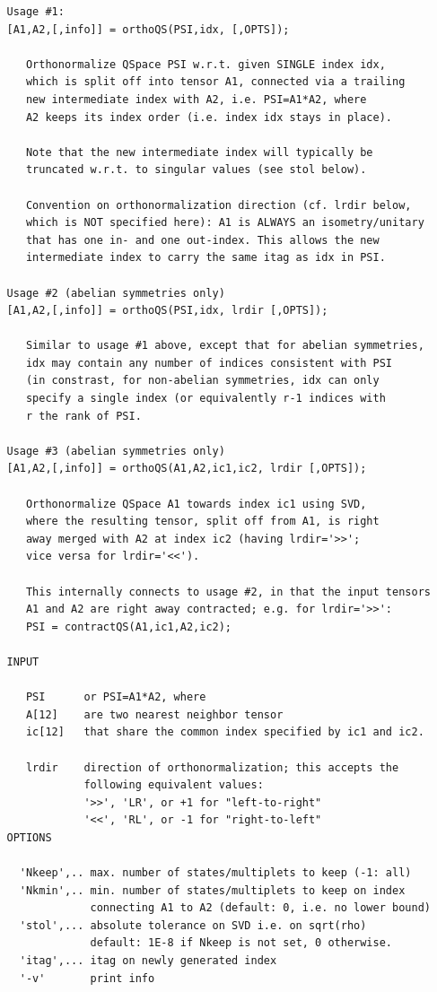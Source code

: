 \documentclass[twoside,12pt]{article}
\begin{document}
\begin{verbatim}
   Usage #1:
   [A1,A2,[,info]] = orthoQS(PSI,idx, [,OPTS]);
 
      Orthonormalize QSpace PSI w.r.t. given SINGLE index idx,
      which is split off into tensor A1, connected via a trailing
      new intermediate index with A2, i.e. PSI=A1*A2, where
      A2 keeps its index order (i.e. index idx stays in place).
 
      Note that the new intermediate index will typically be
      truncated w.r.t. to singular values (see stol below).
 
      Convention on orthonormalization direction (cf. lrdir below,
      which is NOT specified here): A1 is ALWAYS an isometry/unitary
      that has one in- and one out-index. This allows the new
      intermediate index to carry the same itag as idx in PSI.
 
   Usage #2 (abelian symmetries only)
   [A1,A2,[,info]] = orthoQS(PSI,idx, lrdir [,OPTS]);
 
      Similar to usage #1 above, except that for abelian symmetries,
      idx may contain any number of indices consistent with PSI
      (in constrast, for non-abelian symmetries, idx can only
      specify a single index (or equivalently r-1 indices with
      r the rank of PSI.
 
   Usage #3 (abelian symmetries only)
   [A1,A2,[,info]] = orthoQS(A1,A2,ic1,ic2, lrdir [,OPTS]);
 
      Orthonormalize QSpace A1 towards index ic1 using SVD,
      where the resulting tensor, split off from A1, is right
      away merged with A2 at index ic2 (having lrdir='>>';
      vice versa for lrdir='<<').
 
      This internally connects to usage #2, in that the input tensors
      A1 and A2 are right away contracted; e.g. for lrdir='>>':
      PSI = contractQS(A1,ic1,A2,ic2);
 
   INPUT
 
      PSI      or PSI=A1*A2, where
      A[12]    are two nearest neighbor tensor
      ic[12]   that share the common index specified by ic1 and ic2.
 
      lrdir    direction of orthonormalization; this accepts the
               following equivalent values:
               '>>', 'LR', or +1 for "left-to-right"
               '<<', 'RL', or -1 for "right-to-left"
   OPTIONS
 
     'Nkeep',.. max. number of states/multiplets to keep (-1: all)
     'Nkmin',.. min. number of states/multiplets to keep on index
                connecting A1 to A2 (default: 0, i.e. no lower bound)
     'stol',... absolute tolerance on SVD i.e. on sqrt(rho)
                default: 1E-8 if Nkeep is not set, 0 otherwise.
     'itag',... itag on newly generated index
     '-v'       print info
 

\end{verbatim}
\end{document}
